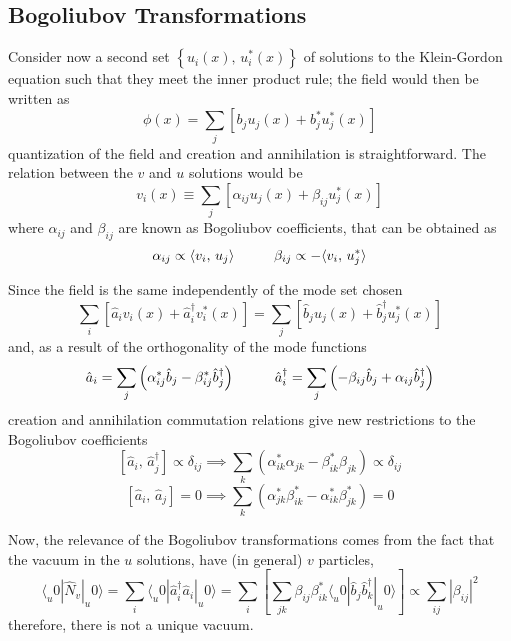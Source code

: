 \subsection{Bogoliubov Transformations}
Consider now a second set $\left\{u_i(x),\,u_i^*(x)\right\}$ of solutions to the Klein-Gordon equation such that they meet the inner product rule; the field would then be written as
\begin{equation}
	\phi(x)=\sum_j\left[b_ju_j(x)+b_j^*u_j^*(x)\right]
\end{equation}
quantization of the field and creation and annihilation is straightforward. The relation between the $v$ and $u$ solutions would be
\begin{equation}
	v_i(x)\equiv\sum_j\left[\alpha_{ij}u_j(x)+\beta_{ij}u^*_j(x)\right]
\end{equation}
where $\alpha_{ij}$ and $\beta_{ij}$ are known as Bogoliubov coefficients, that can be obtained as
\begin{equation}
	\alpha_{ij}\propto\langle v_i,\,u_j\rangle\hspace{1.0cm}\beta_{ij}\propto -\langle v_i,\,u_j^*\rangle
\end{equation}

Since the field is the same independently of the mode set chosen
\begin{equation}
	\sum_i\left[\hat{a}_iv_i(x)+\hat{a}_i^\dagger v^*_i(x)\right]=\sum_j\left[\hat{b}_ju_j(x)+\hat{b}_j^\dagger u_j^*(x)\right]
\end{equation}
and, as a result of the orthogonality of the mode functions
\begin{equation}
	\hat{a}_i=\sum_j\left(\alpha_{ij}^*\hat{b}_j-\beta_{ij}^*\hat{b}_j^\dagger\right)\hspace{1.0cm}\hat{a}_i^\dagger=\sum_j\left(-\beta_{ij}\hat{b}_j+\alpha_{ij}\hat{b}_j^\dagger\right)
\end{equation}
creation and annihilation commutation relations give new restrictions to the Bogoliubov coefficients
\begin{equation}
	\left[\hat{a}_i,\,\hat{a}_j^\dagger\right]\propto\delta_{ij}\implies \sum_k\left(\alpha_{ik}^*\alpha_{jk}-\beta^*_{ik}\beta_{jk}\right)\propto\delta_{ij}
\end{equation}
\begin{equation}
	\left[\hat{a}_i,\,\hat{a}_j\right]=0\implies \sum_k\left(\alpha_{jk}^*\beta_{ik}^*-\alpha_{ik}^*\beta_{jk}^*\right)=0
\end{equation}

Now, the relevance of the Bogoliubov transformations comes from the fact that the vacuum in the $u$ solutions, have (in general) $v$ particles,
\begin{equation}
	\langle_u0|\hat{N}_v|_u0\rangle=\sum_i\langle_u0|\hat{a}_i^\dagger\hat{a}_i|_u0\rangle=\sum_{i}\left[\sum_{jk}\beta_{ij}\beta^*_{ik}\langle_u0|\hat{b}_j\hat{b}_k^\dagger|_u0\rangle\right]\propto \sum_{ij}|\beta_{ij}|^2
\end{equation}
therefore, there is not a unique vacuum.

